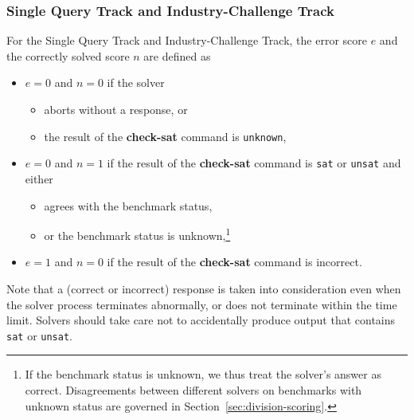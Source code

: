 \documentclass[12pt]{article}
\newcommand{\akey}[1]{\textbf{#1}\xspace}
\newcommand{\maintrack}{Single Query Track\xspace}
\newcommand{\challtrack}{Industry-Challenge Track\xspace}
\begin{document}
\subsubsection{\maintrack and \challtrack}
  For the \maintrack and \challtrack, the error score $e$ and the correctly
  solved score $n$ are defined as
  \begin{itemize}
  \item $e=0$ and $n=0$ if the solver
    \begin{itemize}[noitemsep,nolistsep]
      \item aborts without a response, or
      \item  the result of the \akey{check-sat} command is \texttt{unknown},
    \end{itemize}
  \item $e=0$ and $n=1$ if the result of the \akey{check-sat} command is
      \texttt{sat} or \texttt{unsat} and either
    \begin{itemize}[noitemsep,nolistsep]
      \item agrees with the benchmark status,
      \item or the benchmark status
        is unknown,\footnote{If the benchmark status is unknown, we thus treat
        the solver's answer as correct.  Disagreements between different
        solvers on benchmarks with unknown status are governed in
        Section~\ref{sec:division-scoring}.}
    \end{itemize}
  \item $e=1$ and $n=0$ if the result of the \akey{check-sat} command is
    incorrect.
  \end{itemize}
%
Note that a (correct or incorrect) response is taken into
consideration even when the solver process terminates abnormally, or
does not terminate within the time limit.  Solvers should take care
not to accidentally produce output that contains \texttt{sat} or
\texttt{unsat}.
\end{document}
